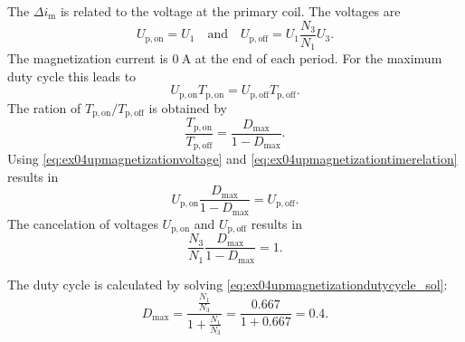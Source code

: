 \begin{solutionblock}
    The $\Delta i_\mathrm{m}$ is related to the voltage at the primary coil. The voltages are
    \begin{equation}
        U_\mathrm{p,on}=U_\mathrm{1}  \quad \text{and} \quad U_\mathrm{p,off}=U_\mathrm{1}\frac{N_\mathrm{3}}{N_\mathrm{1}} U_\mathrm{3}.
        \label{eq:ex04upmagnetizationvoltage}
    \end{equation}     
    The magnetization current is $\SI{0}{\ampere}$ at the end of each period. For the maximum duty cycle this leads to
    \begin{equation}
        U_\mathrm{p,on}T_\mathrm{p,on}=U_\mathrm{p,off}T_\mathrm{p,off}.
        \label{eq:ex04upmagnetizationtimerelation}        
    \end{equation} 
    The ration of $T_\mathrm{p,on}/T_\mathrm{p,off}$ is obtained by
    \begin{equation}
        \frac{T_\mathrm{p,on}}{T_\mathrm{p,off}}=\frac{D_\mathrm{max}}{1-D_\mathrm{max}}.
    \end{equation} 
    Using \eqref{eq:ex04upmagnetizationvoltage} and \eqref{eq:ex04upmagnetizationtimerelation} results in
    \begin{equation}
        U_\mathrm{p,on} \frac{D_\mathrm{max}}{1-D_\mathrm{max}} = U_\mathrm{p,off}.
        \label{eq:ex04upmagnetizationdutycycle}
    \end{equation}
    The cancelation of voltages $U_\mathrm{p,on}$ and $U_\mathrm{p,off}$ results in
    \begin{equation}
        \frac{N_\mathrm{3}}{N_\mathrm{1}} \frac{D_\mathrm{max}}{1-D_\mathrm{max}} = 1.
        \label{eq:ex04upmagnetizationdutycycle_sol}
    \end{equation} 

    The duty cycle is calculated by solving \eqref{eq:ex04upmagnetizationdutycycle_sol}:
    \begin{equation}
        D_\mathrm{max}=\frac{\frac{N_\mathrm{1}}{N_\mathrm{3}}}{1+\frac{N_\mathrm{1}}{N_\mathrm{3}}} 
        = \frac{0.667}{1+0.667}=0.4.
    \end{equation}  
\end{solutionblock}

